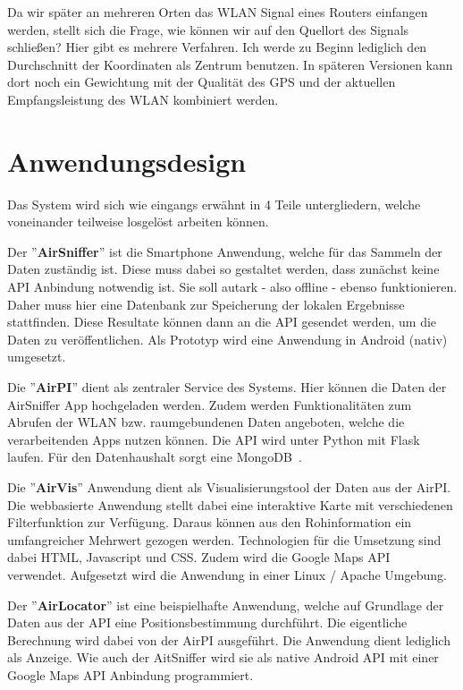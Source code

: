 \documentclass[11pt,a4paper]{article}
\begin{document}
Da wir später an mehreren Orten das WLAN Signal eines Routers einfangen werden, stellt sich die Frage, wie können wir auf den Quellort des Signals schließen? Hier gibt es mehrere Verfahren. Ich werde zu Beginn lediglich den Durchschnitt der Koordinaten als Zentrum benutzen. In späteren Versionen kann dort noch ein Gewichtung mit der Qualität des GPS und der aktuellen Empfangsleistung des WLAN kombiniert werden.

\section{Anwendungsdesign}

Das System wird sich wie eingangs erwähnt in 4 Teile untergliedern, welche voneinander teilweise losgelöst arbeiten können.

Der ''\textbf{AirSniffer}'' ist die Smartphone Anwendung, welche für das Sammeln der Daten zuständig ist. Diese muss dabei so gestaltet werden, dass zunächst keine API Anbindung notwendig ist. Sie soll autark - also offline - ebenso funktionieren. Daher muss hier eine Datenbank zur Speicherung der lokalen Ergebnisse stattfinden. Diese Resultate können dann an die API gesendet werden, um die Daten zu veröffentlichen. Als Prototyp wird eine Anwendung in Android (nativ) umgesetzt. 

Die ''\textbf{AirPI}'' dient als zentraler Service des Systems. Hier können die Daten der AirSniffer App hochgeladen werden. Zudem werden Funktionalitäten zum Abrufen der WLAN bzw. raumgebundenen Daten angeboten, welche die verarbeitenden Apps nutzen können. Die API wird unter Python mit Flask~\cite{flask} laufen. Für den Datenhaushalt sorgt eine MongoDB~\cite{mongodb}.

Die ''\textbf{AirVis}'' Anwendung dient als Visualisierungstool der Daten aus der AirPI. Die webbasierte Anwendung stellt dabei eine interaktive Karte mit verschiedenen Filterfunktion zur Verfügung. Daraus können aus den Rohinformation ein umfangreicher Mehrwert gezogen werden. Technologien für die Umsetzung sind dabei HTML, Javascript und CSS. Zudem wird die Google Maps API~\cite{googlemapsapi} verwendet. Aufgesetzt wird die Anwendung in einer Linux / Apache Umgebung.

Der ''\textbf{AirLocator}'' ist eine beispielhafte Anwendung, welche auf Grundlage der Daten aus der API eine Positionsbestimmung durchführt. Die eigentliche Berechnung wird dabei von der AirPI ausgeführt. Die Anwendung dient lediglich als Anzeige. Wie auch der AitSniffer wird sie als native Android API mit einer Google Maps API Anbindung programmiert.
\end{document}
